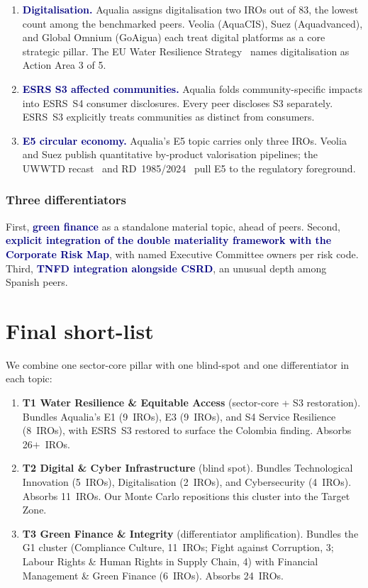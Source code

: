\documentclass[11pt, a4paper, twoside, openright]{scrreprt}
\newcommand{\signalword}[1]{\textbf{\textcolor{navy}{#1}}}
\begin{document}
\begin{enumerate}
\item \signalword{Digitalisation.} Aqualia assigns digitalisation two IROs out of 83, the lowest count among the benchmarked peers. Veolia (AquaCIS), Suez (Aquadvanced), and Global Omnium (GoAigua) each treat digital platforms as a core strategic pillar. The EU Water Resilience Strategy~\cite{waterResilience2025} names digitalisation as Action Area 3 of 5.

\item \signalword{ESRS S3 affected communities.} Aqualia folds community-specific impacts into ESRS~S4 consumer disclosures. Every peer discloses S3 separately. ESRS~S3 explicitly treats communities as distinct from consumers.

\item \signalword{E5 circular economy.} Aqualia's E5 topic carries only three IROs. Veolia and Suez publish quantitative by-product valorisation pipelines; the UWWTD recast~\cite{uwwtd2024} and RD~1985/2024~\cite{rd1985} pull E5 to the regulatory foreground.
\end{enumerate}

\subsubsection{Three differentiators}

First, \signalword{green finance} as a standalone material topic, ahead of peers. Second, \signalword{explicit integration of the double materiality framework with the Corporate Risk Map}, with named Executive Committee owners per risk code. Third, \signalword{TNFD integration alongside CSRD}, an unusual depth among Spanish peers.

\section{Final short-list}

We combine one sector-core pillar with one blind-spot and one differentiator in each topic:

\begin{enumerate}
\item \textbf{T1 Water Resilience \& Equitable Access} (sector-core + S3 restoration). Bundles Aqualia's E1 (9~IROs), E3 (9~IROs), and S4 Service Resilience (8~IROs), with ESRS~S3 restored to surface the Colombia finding. Absorbs 26$+$~IROs.

\item \textbf{T2 Digital \& Cyber Infrastructure} (blind spot). Bundles Technological Innovation (5~IROs), Digitalisation (2~IROs), and Cybersecurity (4~IROs). Absorbs 11~IROs. Our Monte Carlo repositions this cluster into the Target Zone.

\item \textbf{T3 Green Finance \& Integrity} (differentiator amplification). Bundles the G1 cluster (Compliance Culture, 11~IROs; Fight against Corruption, 3; Labour Rights \& Human Rights in Supply Chain, 4) with Financial Management \& Green Finance (6~IROs). Absorbs 24~IROs.
\end{enumerate}
\end{document}
